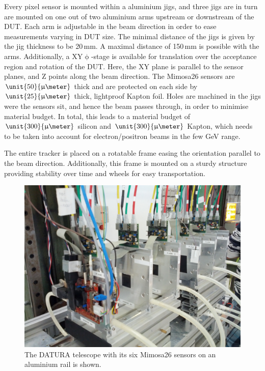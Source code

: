 Every pixel sensor is mounted within a aluminium jigs, and three jigs are in turn are mounted on one out of two aluminium arms upstream or downstream of the DUT. 
Each arm is adjustable in the beam direction in order to ease measurements varying in DUT size.
The minimal distance of the jigs is given by the jig thickness to be 20\,mm. 
A maximal distance of 150\,mm is possible with the arms. 
Additionally, a XY$\upphi$-stage is available for translation over the acceptance region and rotation of the DUT. 
Here, the XY plane is parallel to the sensor planes, and Z points along the beam direction. 
The Mimosa26 sensors are $\unit{50}{\upmu\meter}$ thick and are protected on each side by $\unit{25}{\upmu\meter}$ thick, lightproof Kapton foil. 
Holes are machined in the jigs were the sensors sit, and hence the beam passes through, in order to minimise material budget. 
In total, this leads to a material budget of $\unit{300}{\upmu\meter}$ silicon and $\unit{300}{\upmu\meter}$ Kapton, which needs to be taken into account for electron/positron beams in the few GeV range. 

The entire tracker is placed on a rotatable frame easing the orientation parallel to the beam direction. 
Additionally, this frame is mounted on a sturdy structure providing stability over time and wheels for easy transportation. 

\begin{figure}[tb]
	\center
	\includegraphics[width=.9\textwidth]{figures/AIDA.jpg}
	\caption[The DATURA telescope]{The DATURA telescope with its six Mimosa26 sensors on an aluminium rail is shown.}
	\label{fig:datura-tscope}
\end{figure}

